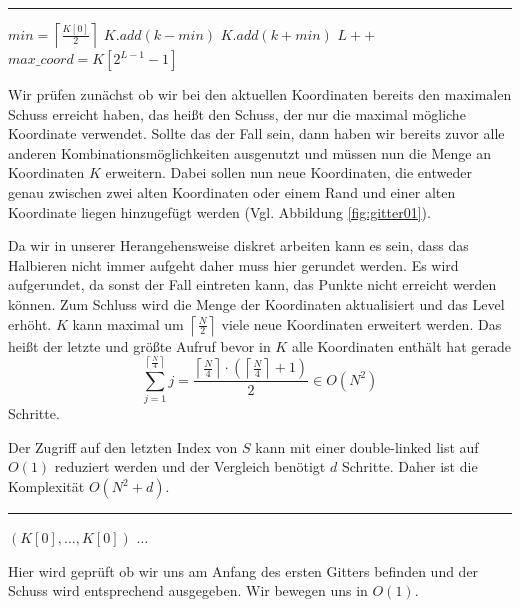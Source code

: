 \documentclass[a4paper,12pt]{llncs}
\numberwithin{equation}{section}
\begin{document}
\smallskip
\hrule
\smallskip
\begin{tcolorbox}
	\begin{algorithmic}
		\State $min=\left\lceil\frac{K[0]}{2}\right\rceil$
		\State $K.add(k-min)$
		\State $K.add(k+min)$
		\EndFor
		\State $L++$
		\State $max\_coord=K\left[2^{L-1}-1\right]$
		\EndIf
	\end{algorithmic}
\end{tcolorbox}
Wir prüfen zunächst ob wir bei den aktuellen Koordinaten bereits den maximalen Schuss erreicht haben, das heißt den Schuss, der nur die maximal mögliche Koordinate verwendet. Sollte das der Fall sein, dann haben wir bereits zuvor alle anderen Kombinationsmöglichkeiten ausgenutzt und müssen nun die Menge an Koordinaten $K$ erweitern. Dabei sollen nun neue Koordinaten, die entweder genau zwischen zwei alten Koordinaten oder einem Rand und einer alten Koordinate liegen hinzugefügt werden (Vgl. Abbildung \ref{fig:gitter01}). 

Da wir in unserer Herangehensweise diskret arbeiten kann es sein, dass das Halbieren nicht immer aufgeht daher muss hier gerundet werden. Es wird aufgerundet, da sonst der Fall eintreten kann, das Punkte nicht erreicht werden können. Zum Schluss wird die Menge der Koordinaten aktualisiert und das Level erhöht. $K$ kann maximal um $\left\lceil\frac{N}{2}\right\rceil$ viele neue Koordinaten erweitert werden. Das heißt der letzte und größte Aufruf bevor in $K$ alle Koordinaten enthält hat gerade 
\begin{equation}
\sum_{j=1}^{\left\lceil\frac{N}{4}\right\rceil}j=\frac{\left\lceil\frac{N}{4}\right\rceil\cdot(\left\lceil\frac{N}{4}\right\rceil+1)}{2}\in O(N^2)
\end{equation}
Schritte.

Der Zugriff auf den letzten Index von $S$ kann mit einer double-linked list auf $O(1)$ reduziert werden und der Vergleich benötigt $d$ Schritte. Daher ist die Komplexität $O\left(N^2+d\right)$.

\smallskip
\hrule
\smallskip

\begin{tcolorbox}
	\begin{algorithmic}
		\If{$S=\emptyset$}
		\State \Return $(K[0],\dots,K[0])$
		\Else
		\State $\dots$
		\EndIf
	\end{algorithmic}
\end{tcolorbox}

Hier wird geprüft ob wir uns am Anfang des ersten Gitters befinden und der Schuss wird entsprechend ausgegeben. Wir bewegen uns in $O(1)$.
\end{document}
